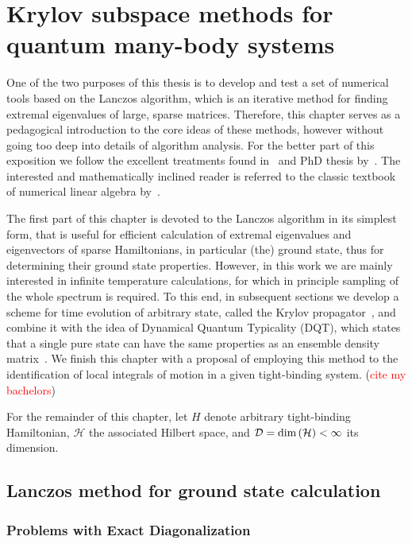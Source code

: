\chapter{Krylov subspace  methods for quantum many-body systems}
\thispagestyle{chapterBeginStyle}

One of the two purposes of this thesis is to develop and test a set of numerical tools based on the Lancz{o}s algorithm,
which is an iterative method for finding extremal eigenvalues of large, sparse matrices. Therefore, this chapter serves as a
pedagogical introduction to the core ideas of these methods, however without going too deep into details of algorithm analysis.
For the better part of this exposition we follow the excellent treatments found in~\textcite{Sandvik2010} and PhD thesis by~\textcite{Crivelli2016}.
The interested and mathematically inclined reader is referred to the classic textbook of numerical linear algebra by~\textcite{Trefethen1997}.

The first part of this chapter is devoted to the Lancz{o}s algorithm in its simplest form, that is useful for efficient calculation
of extremal eigenvalues and eigenvectors of sparse Hamiltonians, in particular (the) ground state, thus for determining their
ground state properties.
However, in this work we are mainly interested in infinite temperature calculations, for which in principle sampling of the whole
spectrum is required.
To this end, in subsequent sections we develop a scheme for time evolution of arbitrary state, called the Krylov propagator~\autocite{Park1986},
 and combine it with the idea of Dynamical Quantum Typicality (DQT), which states that a single pure state can have the same
 properties as an ensemble density matrix~\autocite{Gemmer2003,Goldstein2006,Popescu2006}.
We finish this chapter with a proposal of employing this method to the identification of local integrals of motion in a given
tight-binding system.
 (\textcolor{red}{cite my bachelors})

 For the remainder of this chapter, let \(H\) denote arbitrary tight-binding Hamiltonian, \(\mathcal{H}\) the associated Hilbert space,
 and \(\mathcal{D} = \textrm{dim}\left(\mathcal{H}\right) < \infty\) its dimension.


\section{Lanczos method for ground state calculation}

\subsection{Problems with Exact Diagonalization}

